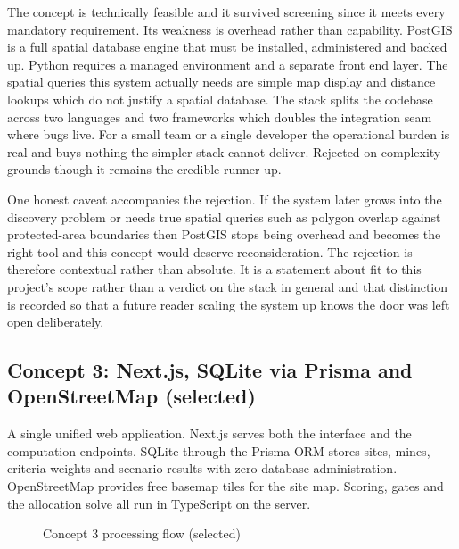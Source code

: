 \documentclass[12pt,a4paper]{report}
\begin{document}
The concept is technically feasible and it survived screening since it
meets every mandatory requirement. Its weakness is overhead rather
than capability. PostGIS is a full spatial database engine that must
be installed, administered and backed up. Python requires a managed
environment and a separate front end layer. The spatial queries this
system actually needs are simple map display and distance lookups
which do not justify a spatial database. The stack splits the codebase
across two languages and two frameworks which doubles the integration
seam where bugs live. For a small team or a single developer the
operational burden is real and buys nothing the simpler stack cannot
deliver. Rejected on complexity grounds though it remains the credible
runner-up.

One honest caveat accompanies the rejection. If the system later grows
into the discovery problem or needs true spatial queries such as
polygon overlap against protected-area boundaries then PostGIS stops
being overhead and becomes the right tool and this concept would
deserve reconsideration. The rejection is therefore contextual rather
than absolute. It is a statement about fit to this project's scope
rather than a verdict on the stack in general and that distinction is
recorded so that a future reader scaling the system up knows the door
was left open deliberately.

\subsection{Concept 3: Next.js, SQLite via Prisma and OpenStreetMap (selected)}
A single unified web application. Next.js serves both the interface
and the computation endpoints. SQLite through the Prisma ORM stores
sites, mines, criteria weights and scenario results with zero database
administration. OpenStreetMap provides free basemap tiles for the site
map. Scoring, gates and the allocation solve all run in TypeScript on
the server.

\begin{figure}[h]
\centering
{}
\caption{Concept 3 processing flow (selected)}
\end{figure}
\end{document}
